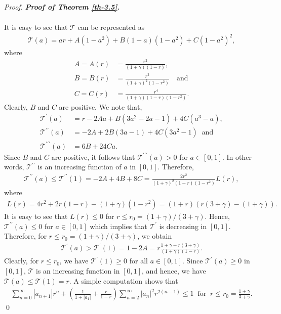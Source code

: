 \documentclass[a4paper,12pt]{amsart}
\theoremstyle{plain}
\theoremstyle{definition}
\newenvironment{pf}[1][]{%
 \vskip 3mm
 \noindent
 \ifthenelse{\equal{#1}{}}%
  {{\slshape Proof. }}%
  {{\slshape #1.} }%
 }%
{\qed\bigskip}
\begin{document}
\begin{pf}[\bf Proof of Theorem \ref{th-3.5}]
\begin{align*}
\end{align*}
It is easy to see that $ \mathcal{T} $ can be represented as 
\begin{align*}
	\mathcal{T}(a)=ar+A(1-a^2)+B(1-a)(1-a^2)+C(1-a^2)^2,
\end{align*}
where 
\begin{align*}
	A=A(r)&=\frac{r^2}{(1+\gamma)(1-r)},\\ B=B(r)&=\frac{r^3}{(1+\gamma)^2(1-r^2)}\quad\mbox{and}\\ C=C(r)&=\frac{r^4}{(1+\gamma)(1-r)(1-r^2)}.
\end{align*}
Clearly, $ B $ and $ C $ are positive. We note that,
\begin{align*}
	\mathcal{T}^{\prime}(a)&=r-2Aa+B(3a^2-2a-1)+4C(a^3-a),\\\mathcal{T}^{\prime\prime}(a)&=-2A+2B(3a-1)+4C(3a^2-1) \;\; \text{and}\;\;\\ \mathcal{T}^{\prime\prime\prime}(a)&= 6B+24Ca.
\end{align*}
Since $ B $ and $ C $ are positive, it follows that $ \mathcal{T}^{\prime\prime\prime}(a)>0 $ for $ a\in [0,1] $. In other words, $ \mathcal{T}^{\prime\prime} $ is an increasing function of $ a $ in $ [0,1]. $ Therefore,
\begin{align*}
	\mathcal{T}^{\prime\prime}(a)\leq \mathcal{T}^{\prime\prime}(1)=-2A+4B+8C=\frac{2r^2}{(1+\gamma)^2(1-r)(1-r^2)}L(r),
\end{align*}
where 
\begin{align*}
	L(r)=4r^2+2r(1-r)-(1+\gamma)(1-r^2)=(1+r)(r(3+\gamma)-(1+\gamma)).
\end{align*}
It is easy to see that $ L(r)\leq 0 $ for $ r\leq r_0=(1+\gamma)/(3+\gamma) $. Hence, $ \mathcal{T}^{\prime\prime}(a)\leq 0 $ for $ a\in [0,1] $ which implies that $ \mathcal{T}^{\prime} $ is decreasing in $ [0,1] $. Therefore, for $ r\leq r_0=(1+\gamma)/(3+\gamma) $, we obtain 
\begin{align*}
	\mathcal{T}^{\prime}(a)>\mathcal{T}^{\prime}(1)=1-2A=r\frac{1+\gamma-r(3+\gamma)}{(1+\gamma)(1-r)}.
\end{align*}
Clearly, for $ r\leq r_0 $, we have $ \mathcal{T}^{\prime}(1)\geq 0 $ for all $ a\in [0,1] $. Since $ \mathcal{T}^{\prime}(a)\geq 0 $ in $ [0,1] $, $ \mathcal{T} $ is an increasing function in $ [0,1] $, and hence, we have $ \mathcal{T}(a)\leq \mathcal{T}(1)=r. $
A simple computation shows that 
\begin{align*}
	\sum_{n=0}^{\infty}|a_{n+1}|r^n+\left(\frac{1}{1+|a_1|}+\frac{r}{1-r}\right)\sum_{n=2}^{\infty}|a_n|^2r^{2(n-1)}\leq 1\;\; \text{for}\;\; r\leq r_0=\frac{1+\gamma}{3+\gamma}.

\end{align*}
\end{pf}
\end{document}
